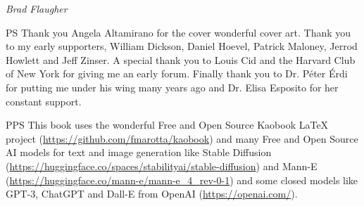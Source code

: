 \begin{flushright}
	\textit{Brad Flaugher}
\end{flushright}

PS Thank you Angela Altamirano for the cover wonderful cover art. Thank you to my early supporters, William Dickson, Daniel Hoevel, Patrick Maloney, Jerrod Howlett and Jeff Zinser. A special thank you to Louis Cid and the Harvard Club of New York for giving me an early forum. Finally thank you to Dr. Péter Érdi for putting me under his wing many years ago and Dr. Elisa Esposito for her constant support. 

PPS This book uses the wonderful Free and Open Source Kaobook LaTeX project (\url{https://github.com/fmarotta/kaobook}) and  many Free and Open Source AI  models for text and image generation like Stable Diffusion (\url{https://huggingface.co/spaces/stabilityai/stable-diffusion}) and Mann-E (\url{https://huggingface.co/mann-e/mann-e_4_rev-0-1}) and some closed models like GPT-3, ChatGPT and Dall-E from OpenAI (\url{https://openai.com/}).
